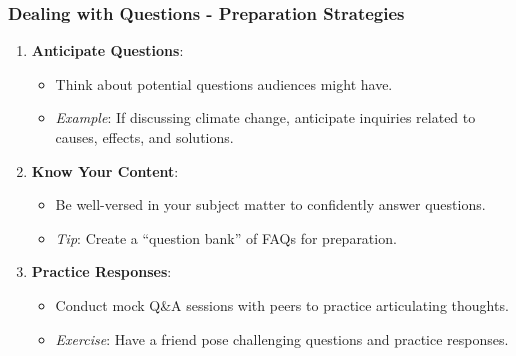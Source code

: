 \documentclass[aspectratio=169]{beamer}
\begin{document}
\begin{frame}[fragile]
    \frametitle{Dealing with Questions - Preparation Strategies}
    \begin{enumerate}
        \item \textbf{Anticipate Questions}:
            \begin{itemize}
                \item Think about potential questions audiences might have.
                \item \textit{Example}: If discussing climate change, anticipate inquiries related to causes, effects, and solutions.
            \end{itemize}
        \item \textbf{Know Your Content}:
            \begin{itemize}
                \item Be well-versed in your subject matter to confidently answer questions.
                \item \textit{Tip}: Create a “question bank” of FAQs for preparation.
            \end{itemize}
        \item \textbf{Practice Responses}:
            \begin{itemize}
                \item Conduct mock Q\&A sessions with peers to practice articulating thoughts.
                \item \textit{Exercise}: Have a friend pose challenging questions and practice responses.
            \end{itemize}
    \end{enumerate}
\end{frame}
\end{document}
